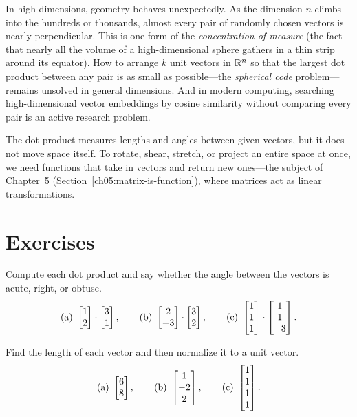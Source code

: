 \begin{historybox}
In high dimensions, geometry behaves unexpectedly. As the dimension $n$ climbs into the hundreds
or thousands, almost every pair of randomly chosen vectors is nearly perpendicular. This is one
form of the \emph{concentration of measure} (the fact that nearly all the volume of a high-dimensional
sphere gathers in a thin strip around its equator). How to arrange $k$ unit vectors in $\mathbb{R}^n$ so that the
largest dot product between any pair is as small as possible---the \emph{spherical code} problem---remains
unsolved in general dimensions. And in modern computing, searching high-dimensional
vector embeddings by cosine similarity without comparing every pair is an active research problem.

The dot product measures lengths and angles between given
vectors, but it does not move space itself. To rotate, shear, stretch, or project an entire space at
once, we need functions that take in vectors and return new ones---the subject of
Chapter~5 (Section~\ref{ch05:matrix-is-function}), where matrices act as linear transformations.
\end{historybox}

\section{Exercises}

\begin{exercise}\label{ch04:ex-warmup}
Compute each dot product and say whether the angle between the vectors is acute,
right, or obtuse.
\[
  \text{(a) } \begin{bmatrix}1\\2\end{bmatrix}\cdot\begin{bmatrix}3\\1\end{bmatrix},\qquad
  \text{(b) } \begin{bmatrix}2\\-3\end{bmatrix}\cdot\begin{bmatrix}3\\2\end{bmatrix},\qquad
  \text{(c) } \begin{bmatrix}1\\1\\1\end{bmatrix}\cdot\begin{bmatrix}1\\1\\-3\end{bmatrix}.
\]
\end{exercise}

\begin{exercise}
Find the length of each vector and then normalize it to a unit vector.
\[
  \text{(a) } \begin{bmatrix}6\\8\end{bmatrix}, \qquad
  \text{(b) } \begin{bmatrix}1\\-2\\2\end{bmatrix}, \qquad
  \text{(c) } \begin{bmatrix}1\\1\\1\\1\end{bmatrix}.
\]
\end{exercise}

